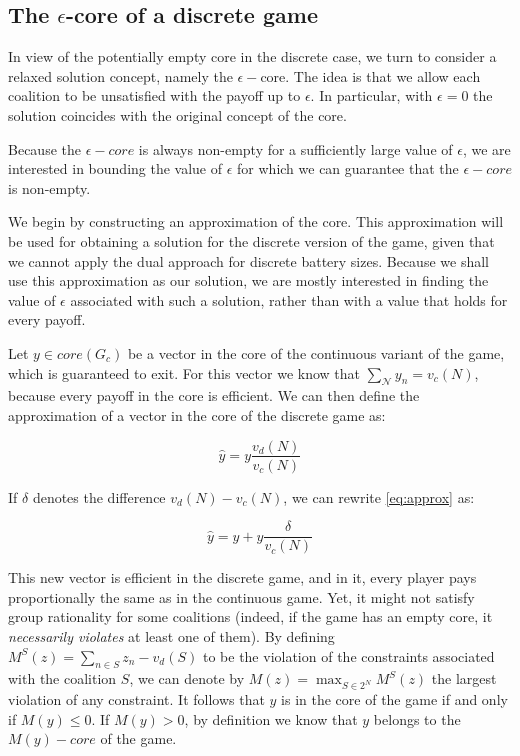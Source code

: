 \subsection{The $\epsilon$-core of a discrete game}\label{sec:approx}

In view of the potentially empty core in the discrete case, we turn to consider 
a relaxed solution concept, namely the $\epsilon-$core. The idea is that we allow each coalition to be unsatisfied with the payoff up to $\epsilon$. In particular, with  $\epsilon = 0$ the solution coincides with the original concept of the core.

Because the $\epsilon-core$ is always non-empty for a sufficiently large value of $\epsilon$, we are interested in bounding the value of $\epsilon$ for which we can guarantee that the $\epsilon-core$ is non-empty.

We begin by constructing an approximation of the core. This approximation will be used for obtaining a solution for the discrete version of the game, given that we cannot apply the dual approach for discrete battery sizes. Because we shall use this approximation as our solution, we are mostly interested in finding the value of $\epsilon$ associated with such a solution, rather than with a value that holds for every payoff.


Let $y \in core(G_c)$ be a vector in the core of the continuous variant of the game, which is guaranteed to exit. For this vector we know that $\sum_{\mathcal{N}} y_n  = v_c(N)$, because every payoff in the core is efficient. 
We can then define the approximation of a vector in the core of the discrete game as:

\begin{equation}\label{eq:approx}
 \hat{y} = y \frac{v_d(N)}{v_c(N)}
\end{equation}

If $\delta$ denotes the difference $v_d(N) - v_c(N)$, we can rewrite \eqref{eq:approx} as:

\begin{equation}\label{eq:re-approx}
 \hat{y} = y +  y\frac{\delta}{v_c(N)}
\end{equation}

This new vector is efficient in the discrete game, and in it, every player pays proportionally the same as in the continuous game. Yet, it might not satisfy group rationality for some coalitions (indeed, if the game has an empty core, it {\em necessarily violates} at least one of them).
By defining $M^S(z) = \sum_{n \in S} z_n - v_d(S)$ to be the violation of the constraints associated with the coalition $S$, we can denote by $M(z) = \max_{S \in 2^N} M^S(z)$ the largest violation of any constraint. It follows that $y$ is in the core of the game if and only if $M(y) \leq 0$. If $M(y) > 0$, by definition we know that $y$ belongs to the $M(y)-core$ of the game.


